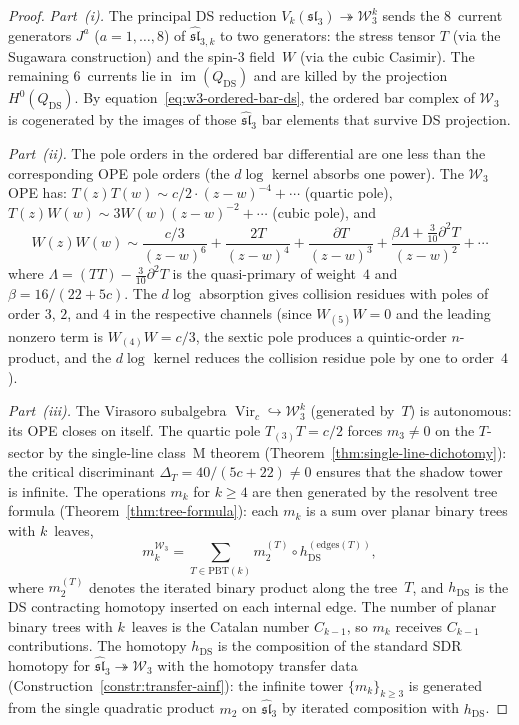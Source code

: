 \begin{proof}
\emph{Part~(i).} The principal DS reduction
$V_k(\mathfrak{sl}_3) \twoheadrightarrow \mathcal{W}_3^k$
sends the $8$~current generators $J^a$ ($a = 1, \ldots, 8$) of
$\widehat{\mathfrak{sl}}_{3,k}$ to two generators: the stress tensor
$T$ (via the Sugawara construction) and the spin-$3$ field~$W$
(via the cubic Casimir). The remaining $6$~currents lie in
$\operatorname{im}(Q_{\mathrm{DS}})$ and are killed by the
projection $H^0(Q_{\mathrm{DS}})$. By
equation~\eqref{eq:w3-ordered-bar-ds}, the ordered bar complex
of $\mathcal{W}_3$ is cogenerated by the images of those
$\widehat{\mathfrak{sl}}_3$ bar elements that survive DS projection.

\emph{Part~(ii).} The pole orders in the ordered bar differential
are one less than the corresponding OPE pole orders
(the $d\log$ kernel absorbs one power). The
$\mathcal{W}_3$ OPE has: $T(z)T(w) \sim c/2 \cdot (z{-}w)^{-4}
+ \cdots$ (quartic pole), $T(z)W(w) \sim 3W(w)(z{-}w)^{-2}
+ \cdots$ (cubic pole), and
\begin{equation}\label{eq:ww-ope-leading-ordered}
W(z)W(w) \sim \frac{c/3}{(z{-}w)^6}
+ \frac{2T}{(z{-}w)^4}
+ \frac{\partial T}{(z{-}w)^3}
+ \frac{\beta\Lambda + \tfrac{3}{10}\partial^2 T}{(z{-}w)^2}
+ \cdots
\end{equation}
where $\Lambda = (TT) - \tfrac{3}{10}\partial^2 T$ is the
quasi-primary of weight~$4$ and
$\beta = 16/(22 + 5c)$. The $d\log$ absorption
gives collision residues with poles of order $3$, $2$, and $4$ in the
respective channels (since $W_{(5)}W = 0$ and the leading nonzero
term is $W_{(4)}W = c/3$, the sextic pole produces a quintic-order
$n$-product, and the $d\log$ kernel reduces the collision residue
pole by one to order~$4$).

\emph{Part~(iii).} The Virasoro subalgebra
$\operatorname{Vir}_c \hookrightarrow \mathcal{W}_3^k$ (generated
by~$T$) is autonomous: its OPE closes on itself. The quartic pole
$T_{(3)}T = c/2$ forces $m_3 \neq 0$ on the $T$-sector by the
single-line class~M theorem
(Theorem~\ref{thm:single-line-dichotomy}): the critical
discriminant $\Delta_T = 40/(5c+22) \neq 0$ ensures that the shadow
tower is infinite. The operations $m_k$ for $k \geq 4$ are then
generated by the resolvent tree formula
(Theorem~\ref{thm:tree-formula}): each $m_k$ is a sum over
planar binary trees with $k$~leaves,
\begin{equation}\label{eq:w3-resolvent-tree}
m_k^{\mathcal{W}_3}
= \sum_{T \in \mathrm{PBT}(k)}
 m_2^{(T)} \circ h_{\mathrm{DS}}^{(\mathrm{edges}(T))},
\end{equation}
where $m_2^{(T)}$ denotes the iterated binary product along the
tree~$T$, and $h_{\mathrm{DS}}$ is the DS contracting homotopy
inserted on each internal edge. The number of planar binary trees
with $k$~leaves is the Catalan number $C_{k-1}$, so $m_k$ receives
$C_{k-1}$ contributions. The homotopy $h_{\mathrm{DS}}$
is the composition of the standard SDR homotopy for
$\widehat{\mathfrak{sl}}_3 \twoheadrightarrow \mathcal{W}_3$ with
the homotopy transfer data
(Construction~\ref{constr:transfer-ainf}): the infinite tower
$\{m_k\}_{k \geq 3}$ is generated from the single quadratic product
$m_2$ on $\widehat{\mathfrak{sl}}_3$ by iterated composition with
$h_{\mathrm{DS}}$.


\end{proof}
